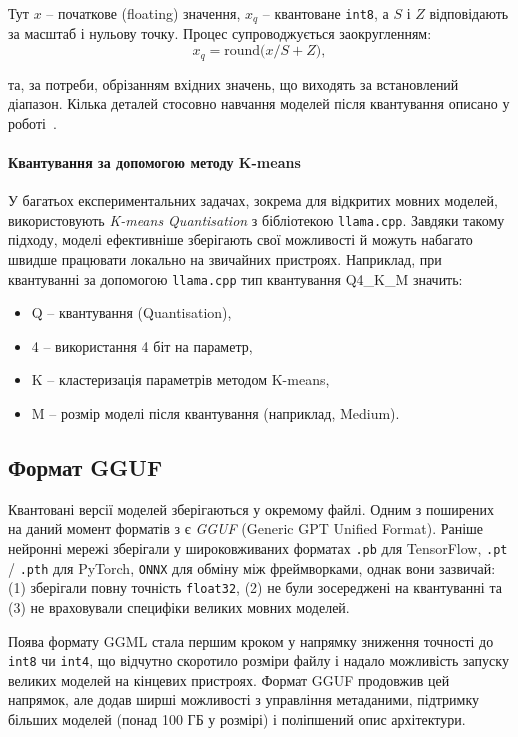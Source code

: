 Тут $x$ -- початкове (floating) значення, $x_q$ -- квантоване \texttt{int8}, а $S$ і $Z$ відповідають за масштаб і нульову точку. Процес супроводжується заокругленням:
\begin{equation}
x_q = \text{round}\!\bigl(x/S + Z\bigr),
\end{equation}

та, за потреби, обрізанням вхідних значень, що виходять за встановлений діапазон. Кілька деталей стосовно навчання моделей після квантування описано у роботі~\cite{jacob2017quantizationtrainingneuralnetworks}.

\paragraph{Квантування за допомогою методу K-means}

У багатьох експериментальних задачах, зокрема для відкритих мовних моделей, використовують \emph{K-means Quantisation} з бібліотекою \texttt{llama.cpp}. Завдяки такому підходу, моделі ефективніше зберігають свої можливості й можуть набагато швидше працювати локально на звичайних пристроях. Наприклад, при квантуванні за допомогою \texttt{llama.cpp} тип квантування Q4\_K\_M значить:
\begin{itemize}
    \item {Q} -- квантування (Quantisation),
    \item {4} -- використання 4 біт на параметр,
    \item {K} -- кластеризація параметрів методом K-means,
    \item {M} -- розмір моделі після квантування (наприклад, Medium).
\end{itemize}

\subsection{Формат GGUF}

Квантовані версії моделей зберігаються у окремому файлі. Одним з поширених на даний момент форматів з є \emph{GGUF} (Generic GPT Unified Format). Раніше нейронні мережі зберігали у широковживаних форматах \texttt{.pb} для TensorFlow, \texttt{.pt} / \texttt{.pth} для PyTorch, \texttt{ONNX} для обміну між фреймворками, однак вони зазвичай: (1) зберігали повну точність \texttt{float32}, (2) не були зосереджені на квантуванні та (3) не враховували специфіки великих мовних моделей.

Поява формату GGML стала першим кроком у напрямку зниження точності до \texttt{int8} чи \texttt{int4}, що відчутно скоротило розміри файлу і надало можливість запуску великих моделей на кінцевих пристроях. Формат GGUF продовжив цей напрямок, але додав ширші можливості з управління метаданими, підтримку більших моделей (понад 100 ГБ у розмірі) і поліпшений опис архітектури.

